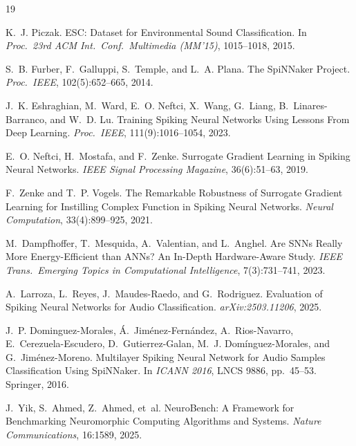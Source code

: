 \documentclass[sigconf,nonacm=false]{acmart}
\begin{document}

\begin{thebibliography}{19}

K.~J. Piczak.
\newblock ESC: Dataset for Environmental Sound Classification.
\newblock In \textit{Proc.\ 23rd ACM Int.\ Conf.\ Multimedia (MM'15)}, 1015--1018, 2015.

S.~B. Furber, F.~Galluppi, S.~Temple, and L.~A. Plana.
\newblock The SpiNNaker Project.
\newblock \textit{Proc.\ IEEE}, 102(5):652--665, 2014.

J.~K. Eshraghian, M.~Ward, E.~O. Neftci, X.~Wang, G.~Liang, B.~Linares-Barranco, and W.~D. Lu.
\newblock Training Spiking Neural Networks Using Lessons From Deep Learning.
\newblock \textit{Proc.\ IEEE}, 111(9):1016--1054, 2023.

E.~O. Neftci, H.~Mostafa, and F.~Zenke.
\newblock Surrogate Gradient Learning in Spiking Neural Networks.
\newblock \textit{IEEE Signal Processing Magazine}, 36(6):51--63, 2019.

F.~Zenke and T.~P. Vogels.
\newblock The Remarkable Robustness of Surrogate Gradient Learning for Instilling Complex Function in Spiking Neural Networks.
\newblock \textit{Neural Computation}, 33(4):899--925, 2021.

M.~Dampfhoffer, T.~Mesquida, A.~Valentian, and L.~Anghel.
\newblock Are SNNs Really More Energy-Efficient than ANNs? An In-Depth Hardware-Aware Study.
\newblock \textit{IEEE Trans.\ Emerging Topics in Computational Intelligence}, 7(3):731--741, 2023.

A.~Larroza, L.~Reyes, J.~Maudes-Raedo, and G.~Rodriguez.
\newblock Evaluation of Spiking Neural Networks for Audio Classification.
\newblock \textit{arXiv:2503.11206}, 2025.

J.~P. Dominguez-Morales, \'{A}.~Jim\'{e}nez-Fern\'{a}ndez, A.~Rios-Navarro, E.~Cerezuela-Escudero, D.~Gutierrez-Galan, M.~J. Dom\'{i}nguez-Morales, and G.~Jim\'{e}nez-Moreno.
\newblock Multilayer Spiking Neural Network for Audio Samples Classification Using SpiNNaker.
\newblock In \textit{ICANN 2016}, LNCS 9886, pp.~45--53. Springer, 2016.

J.~Yik, S.~Ahmed, Z.~Ahmed, et~al.
\newblock NeuroBench: A Framework for Benchmarking Neuromorphic Computing Algorithms and Systems.
\newblock \textit{Nature Communications}, 16:1589, 2025.


\end{thebibliography}
\end{document}
